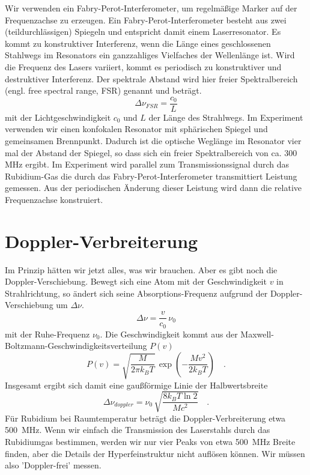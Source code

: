 Wir verwenden ein Fabry-Perot-Interferometer, um regelmäßige Marker auf der Frequenzachse zu erzeugen. Ein Fabry-Perot-Interferometer besteht aus zwei (teildurchlässigen) Spiegeln und entspricht damit einem Laserresonator. Es kommt zu konstruktiver Interferenz, wenn die Länge eines geschlossenen Stahlwegs im Resonators ein ganzzahliges Vielfaches der  Wellenlänge ist. Wird die Frequenz des Lasers variiert, kommt es periodisch zu konstruktiver und destruktiver Interferenz. Der spektrale Abstand wird hier freier Spektralbereich (engl. free spectral range, FSR) genannt und beträgt.
	\begin{equation}
	\Delta\nu_{FSR}=\frac{c_0}{L}  
	\end{equation}
mit der Lichtgeschwindigkeit $c_0$ und $L$ der Länge des Strahlwegs. Im Experiment verwenden wir einen konfokalen Resonator mit sphärischen Spiegel und gemeinsamen Brennpunkt. Dadurch ist die optische Weglänge im Resonator vier mal der Abstand der Spiegel,  so dass sich ein freier Spektralbereich von ca. 300 MHz ergibt. Im Experiment wird parallel zum Transmissionssignal durch das Rubidium-Gas die durch das Fabry-Perot-Interferometer transmittiert Leistung gemessen. Aus der periodischen Änderung dieser Leistung wird dann die relative Frequenzachse konstruiert.





\section{Doppler-Verbreiterung}

Im Prinzip hätten wir jetzt alles, was wir brauchen. Aber es gibt noch die Doppler-Verschiebung. Bewegt sich eine Atom mit der Geschwindigkeit  $v$ in Strahlrichtung, so ändert sich seine Absorptions-Frequenz aufgrund der Doppler-Verschiebung um $\Delta \nu$.
\begin{equation}
	\Delta \nu = \frac{v}{c_0} \, \nu_0
\end{equation}
mit der Ruhe-Frequenz $\nu_0$. Die Geschwindigkeit kommt  aus der  Maxwell-Boltzmann-Geschwindigkeitsverteilung $P(v)$
\begin{equation}
	P(v) = \sqrt{\frac{M}{2 \pi k_B T}} \, \exp \left (
	- \frac{M v^2}{2  k_B T}	
	\right) \quad .
\end{equation}
Insgesamt ergibt sich damit eine gaußförmige  Linie der Halbwertsbreite 
\begin{equation}
	 \Delta \nu_{doppler} = \nu_0 \, \sqrt{\frac{8 k_B T \ln 2} {M c^2}} \quad .
\end{equation}
Für Rubidium bei Raumtemperatur beträgt die Doppler-Verbreiterung etwa 500~MHz. Wenn wir einfach die Transmission des Laserstahls durch das Rubidiumgas bestimmen, werden wir nur vier Peaks von etwa 500~MHz Breite finden, aber die Details der Hyperfeinstruktur nicht auflösen können. Wir müssen also 'Doppler-frei' messen.


